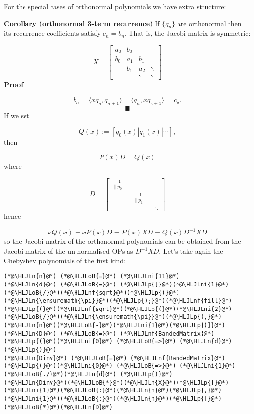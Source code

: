 \documentclass[12pt,a4paper]{article}
\newcommand{\HLJLn}[1]{#1}
\newcommand{\HLJLnf}[1]{\textcolor[RGB]{66,102,213}{#1}}
\newcommand{\HLJLni}[1]{\textcolor[RGB]{59,151,46}{#1}}
\newcommand{\HLJLoB}[1]{\textcolor[RGB]{102,102,102}{\textbf{#1}}}
\newcommand{\HLJLp}[1]{#1}
\begin{document}
For the special cases of orthonormal polynomials we have extra structure:

\textbf{Corollary (orthonormal 3-term recurrence)} If $\{q_n\}$ are orthonormal then its recurrence coefficients satisfy $c_n = b_n$. That is, the Jacobi matrix is symmetric:

\[
X = \begin{bmatrix} a_0 & b_0 \\
                                                        b_0 & a_1 & b_1\\
                                                        & b_1 & a_2 & \ensuremath{\ddots} \\
                                                        && \ensuremath{\ddots} & \ensuremath{\ddots}
                                                        \end{bmatrix}
\]
\textbf{Proof}

\[
b_n = \ensuremath{\langle}x q_n, q_{n+1}\ensuremath{\rangle} = \ensuremath{\langle}q_n, x q_{n+1}\ensuremath{\rangle} = c_{n}.
\]
\[
\blacksquare
\]
If we set

\[
Q(x) := [q_0(x) | q_1(x) | \ensuremath{\cdots}],
\]
then

\[
P(x)D = Q(x)
\]
where

\[
D = \begin{bmatrix}
\frac{1}{\|p_0 \|} &   &     \\
                   & \frac{1}{\|p_1 \|} &   \\
                   &                    & \ddots
\end{bmatrix}
\]
hence 

\[
xQ(x) = xP(x)D = P(x)XD = Q(x)D^{-1}XD
\]
so the Jacobi matrix of the orthonormal polynomials can be obtained from the Jacobi matrix of the un-normalised OPs as $D^{-1}XD$.  Let's take again the Chebyshev polynomials of the first kind:


\begin{lstlisting}
(*@\HLJLn{n}@*) (*@\HLJLoB{=}@*) (*@\HLJLni{11}@*)
(*@\HLJLn{d}@*) (*@\HLJLoB{=}@*) (*@\HLJLp{[}@*)(*@\HLJLni{1}@*)(*@\HLJLoB{/}@*)(*@\HLJLnf{sqrt}@*)(*@\HLJLp{(}@*)(*@\HLJLn{\ensuremath{\pi}}@*)(*@\HLJLp{);}@*)(*@\HLJLnf{fill}@*)(*@\HLJLp{(}@*)(*@\HLJLnf{sqrt}@*)(*@\HLJLp{(}@*)(*@\HLJLni{2}@*)(*@\HLJLoB{/}@*)(*@\HLJLn{\ensuremath{\pi}}@*)(*@\HLJLp{),}@*)(*@\HLJLn{n}@*)(*@\HLJLoB{-}@*)(*@\HLJLni{1}@*)(*@\HLJLp{)]}@*)
(*@\HLJLn{D}@*) (*@\HLJLoB{=}@*) (*@\HLJLnf{BandedMatrix}@*)(*@\HLJLp{(}@*)(*@\HLJLni{0}@*) (*@\HLJLoB{=>}@*) (*@\HLJLn{d}@*)(*@\HLJLp{)}@*)
(*@\HLJLn{Dinv}@*) (*@\HLJLoB{=}@*) (*@\HLJLnf{BandedMatrix}@*)(*@\HLJLp{(}@*)(*@\HLJLni{0}@*) (*@\HLJLoB{=>}@*) (*@\HLJLni{1}@*) (*@\HLJLoB{./}@*)(*@\HLJLn{d}@*) (*@\HLJLp{)}@*)
(*@\HLJLn{Dinv}@*)(*@\HLJLoB{*}@*)(*@\HLJLn{X}@*)(*@\HLJLp{[}@*)(*@\HLJLni{1}@*)(*@\HLJLoB{:}@*)(*@\HLJLn{n}@*)(*@\HLJLp{,}@*)(*@\HLJLni{1}@*)(*@\HLJLoB{:}@*)(*@\HLJLn{n}@*)(*@\HLJLp{]}@*)(*@\HLJLoB{*}@*)(*@\HLJLn{D}@*)
\end{lstlisting}
\end{document}
